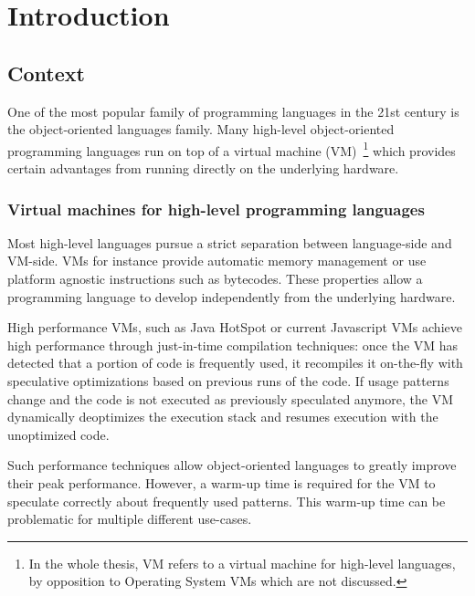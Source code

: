 \documentclass[a4paper,12pt,twoside]{../includes/ThesisStyle}
\begin{document}
\fi

\chapter{Introduction}
\label{chap:intro}
\minitoc


\section{Context}

One of the most popular family of programming languages in the 21st century is the object-oriented languages family. Many high-level object-oriented programming languages run on top of a virtual machine (VM)~\footnote{In the whole thesis, VM refers to a virtual machine for high-level languages, by opposition to Operating System VMs which are not discussed.} which provides certain advantages from running directly on the underlying hardware. 

\subsection{Virtual machines for high-level programming languages}

Most high-level languages pursue a strict separation between language-side and VM-side. VMs for instance provide automatic memory management or use platform agnostic instructions such as bytecodes. These properties allow a programming language to develop independently from the underlying hardware.

High performance VMs, such as Java HotSpot or current Javascript VMs achieve high performance through just-in-time compilation techniques: once the VM has detected that a portion of code is frequently used, it recompiles it on-the-fly with speculative optimizations based on previous runs of the code. If usage patterns change and the code is not executed as previously speculated anymore, the VM dynamically deoptimizes the execution stack and resumes execution with the unoptimized code.

Such performance techniques allow object-oriented languages to greatly improve their peak performance. However, a warm-up time is required for the VM to speculate correctly about frequently used patterns. This warm-up time can be problematic for multiple different use-cases.
\end{document}
